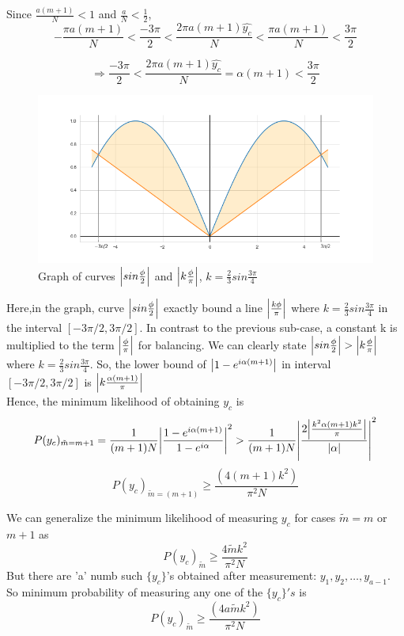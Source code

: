 Since $\frac{a(m+1)}{N} < 1$ and $\frac{a}{N} < \frac{1}{2}$,  $$-\frac{\pi a (m+1)}{N} < \frac{-3\pi}{2}< \frac{2\pi a (m+1)\hat{y_c}}{N} < \frac{\pi a (m+1)}{N} < \frac{3\pi}{2}$$
        
$$\Rightarrow \frac{-3\pi}{2}< \frac{2\pi a (m+1)\hat{y_c}}{N}=\alpha (m+1)<  \frac{3\pi}{2}$$
\begin{figure}[H]
    \centering
     \includegraphics[scale=0.4]{figures/sinx__2_less_than_k_x__pi.png}
    \caption{Graph of curves $\abs{sin\frac{\phi}{2} }$ and $\abs{k\frac{\phi}{\pi}} $, $k= \frac{2}{3} sin\frac{3\pi}{4}$}
    \label{fig: sinx__2_less_than_k_x__pi}
\end{figure}
Here,in the graph, curve $\abs{sin\frac{\phi}{2} }$ exactly bound a line $\abs{\frac{k\phi}{\pi}}$ where $k= \frac{2}{3} sin\frac{3\pi}{4}$  in the interval $[-3\pi/2,3\pi/2]$. In contrast to the previous sub-case, a constant k is multiplied to the term $\abs{\frac{\phi}{\pi}}$ for balancing. We can clearly state $\abs{sin\frac{\phi}{2}} > \abs{k\frac{\phi}{\pi}}$ where $k= \frac{2}{3} sin\frac{3\pi}{4}$. So, the lower bound of $\abs{1-e^{i\alpha (m+1)}}$ in interval $[-3\pi/2, 3\pi/2]$ is $\abs{k \frac{\alpha (m+1)}{\pi}}$
\\Hence, the minimum likelihood of obtaining $y_c$ is
$$ P(y_c)_{\tilde{m}=m+1} = \frac{1}{(m+1)N}\abs{\frac{1-e ^{i\alpha (m+1)}}{1-e ^{i\alpha }}}^2 > \frac{1}{(m+1)N} \abs{\frac{2\abs{\frac{k^2\alpha (m+1) k^2}{\pi}}}{\abs{\alpha}}}^2$$
\begin{equation}
    P(y_c)_{\tilde{m}=(m+1)} \geq \frac{(4 (m+1) k^2)}{\pi^2 N}
    \label{eq: probability_yc_m+1}
\end{equation}

We can generalize the minimum likelihood of measuring $y_c$ for cases $\tilde{m}=m$ or $m+1$ as 
\begin{equation}
    P(y_c)_{\tilde{m}} \geq \frac{4 \tilde{m} k^2}{\pi^2 N}
    \label{eq: probability_yc_general}
\end{equation}
But there are 'a' numb such $\{y_c\}$'s obtained after measurement: $y_1,y_2,\dots ,y_{a-1}$. So minimum probability of measuring any one of the $\{y_c\}'s$ is 
\begin{equation}
    P(y_c)_{\tilde{m}} \geq \frac{(4 a\tilde{m} k^2)}{\pi^2 N}
    \label{eq: probability_one_yc_general}
\end{equation}

